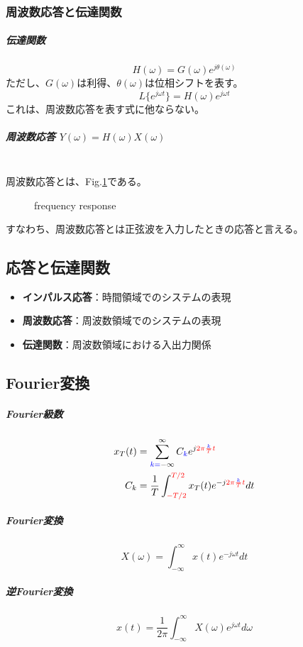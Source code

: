 \documentclass[twocolumn]{ltjsarticle}
\begin{document}
\subsubsection{周波数応答と伝達関数}
\subparagraph{伝達関数}
$$H(\omega)=G(\omega)e^{j\theta(\omega)}$$
ただし、$G(\omega)$は利得、$\theta(\omega)$は位相シフトを表す。
$$L\{e^{j\omega t}\}=H(\omega)e^{j\omega t}$$
これは、周波数応答を表す式に他ならない。
\subparagraph{周波数応答 $Y(\omega)=H(\omega)X(\omega)$}\leavevmode\\
周波数応答とは、Fig.\ref{fig_H}である。
\begin{figure}[ht]
    \centering
    \caption{frequency response}
    \label{fig_H}
\end{figure}
すなわち、周波数応答とは正弦波を入力したときの応答と言える。
\subsection{応答と伝達関数}
\begin{itemize}
    \item \textbf{インパルス応答}：時間領域でのシステムの表現
    \item \textbf{周波数応答}：周波数領域でのシステムの表現 
    \item \textbf{伝達関数}：周波数領域における入出力関係
\end{itemize}
\subsection{Fourier変換}
\subparagraph{Fourier級数}
\begin{align*}
x_T(t)&=\sum _{\textcolor{blue}{k=}-\infty} ^{\infty} {C_{\textcolor{blue}{k}} e^{j\textcolor{red}{2\pi\frac{\textcolor{blue}{k}}{T}t}}}\\
C_k&=\frac{1}{T}\int_{\textcolor{red}{-T/2}}^{\textcolor{red}{T/2}}x_{T}(t)e^{-j\textcolor{red}{2\pi\frac{\textcolor{blue}{k}}{T}t}}dt
\end{align*}
\subparagraph{Fourier変換}
$$X(\omega)=\int_{-\infty}^{\infty}x(t)e^{-j\omega t}dt$$
\subparagraph{逆Fourier変換}
$$x(t)=\frac{1}{2\pi}\int_{-\infty}^{\infty}X(\omega)e^{j\omega t}d\omega$$
\end{document}
